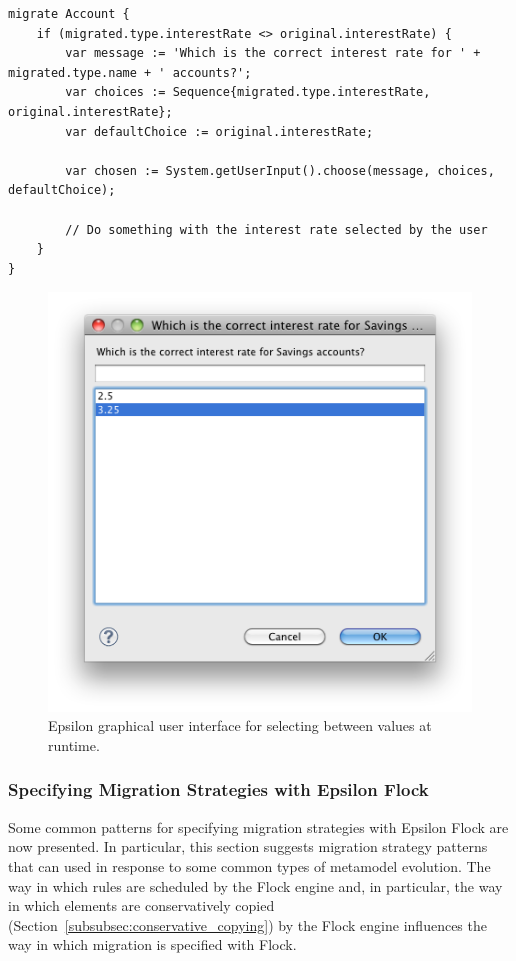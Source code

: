 \begin{lstlisting}[caption=Prompting for user input at runtime, label=lst:user_input, language=Flock, float=tb]
migrate Account {
	if (migrated.type.interestRate <> original.interestRate) {
		var message := 'Which is the correct interest rate for ' + migrated.type.name + ' accounts?';
		var choices := Sequence{migrated.type.interestRate, original.interestRate};
		var defaultChoice := original.interestRate;
		
		var chosen := System.getUserInput().choose(message, choices, defaultChoice);
	
		// Do something with the interest rate selected by the user
	}
}
\end{lstlisting}

\begin{figure}[tbp]
	\centering
		\includegraphics[scale=0.5]{5.Implementation/images/user_input.png}
	\caption[Epsilon GUI for selecting a value at runtime]{Epsilon graphical user interface for selecting between values at runtime.}
	\label{fig:user_input}
\end{figure}


\subsubsection{Specifying Migration Strategies with Epsilon Flock}
Some common patterns for specifying migration strategies with Epsilon Flock are now presented. In particular, this section suggests migration strategy patterns that can used in response to some common types of metamodel evolution. The way in which rules are scheduled by the Flock engine and, in particular, the way in which elements are conservatively copied (Section~\ref{subsubsec:conservative_copying}) by the Flock engine influences the way in which migration is specified with Flock.

